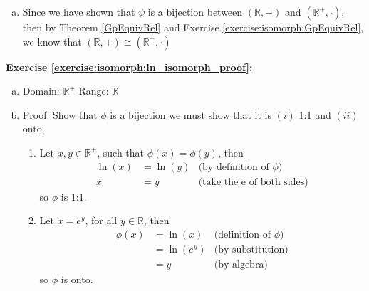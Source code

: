 \begin{enumerate}[(a)]
\item
Since we have shown that $\psi$ is a bijection between $({\mathbb R},+)$ and $({\mathbb R}^+,\cdot)$, then by Theorem \ref{GpEquivRel} and Exercise \ref{exercise:isomorph:GpEquivRel}, we know that $({\mathbb R},+) \cong ({\mathbb R}^+,\cdot)$
\\
\end{enumerate}

\noindent\textbf{Exercise \ref{exercise:isomorph:ln_isomorph_proof}:}
\begin{enumerate}[(a)]
\item
Domain: ${\mathbb R}^+$  Range: ${\mathbb R}$

\item
Proof: Show that $\phi$ is a bijection we must show that it is $(i)$ 1:1 and $(ii)$ onto.
	\begin{enumerate}[($i$)]
	\item
	Let $x, y \in {\mathbb R}^+$, such that $\phi(x) = \phi(y)$, then
	\begin{align*}
	\ln(x) &= \ln(y) &\text{(by definition of\ } \phi)
	\\
	x &= y &\text{(take the e of both sides)}
	\end{align*}
	so $\phi$ is 1:1.

	\item
	Let $x = e^y$, for all $y \in {\mathbb R}$, then
	\begin{align*}
	\phi(x) &= \ln(x) &\text{(definition of\ } \phi)
	\\
	&= \ln(e^y) &\text{(by substitution)}
	\\
	&= y &\text{(by algebra)}
	\end{align*}
	so $\phi$ is onto.
	\end{enumerate}


\end{enumerate}

